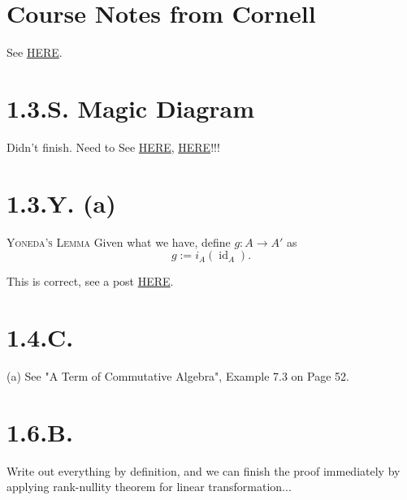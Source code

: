 \section{Course Notes from Cornell}

See \href{https://pi.math.cornell.edu/~dmehrle/notes/cornell/17fa/6670notes.pdf}{HERE}.

\section{1.3.S. Magic Diagram}
Didn't finish. Need to See \href{https://mathoverflow.net/questions/80797/magic-square-of-fibered-products-vague-unclear/80812#80812}{HERE}, \href{https://math.stackexchange.com/questions/778186/the-magic-diagram-is-cartesian}{HERE}!!!

\section{1.3.Y. (a)}
\textsc{Yoneda's Lemma}
Given what we have, define $g:A\to A'$ as 
$$g:=i_A(\operatorname{id}_A).$$ 

This is correct, see a post \href{https://math.stackexchange.com/questions/2919959/yoneda-lemma-in-vakil-s-foag-1-3-y}{HERE}.

\section{1.4.C.}

(a) See "A Term of Commutative Algebra", Example 7.3 on Page 52.

\section{1.6.B.}
Write out everything by definition, and we can finish the proof immediately by applying rank-nullity theorem for linear transformation... 
